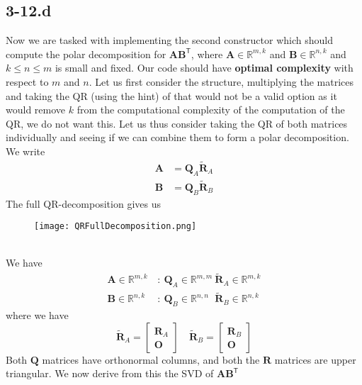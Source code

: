 \documentclass{article}
\begin{document}
\subsection*{3-12.d}
Now we are tasked with implementing the second constructor which should compute the polar decomposition for $\mathbf{A}\mathbf{B}^{\mathsf{T}}$, where $\mathbf{A}\in \mathbb{R}^{m,k}$ and $\mathbf{B}\in \mathbb{R}^{n,k}$ and $k \leq n \leq m$  is small and fixed. Our code should have \textbf{optimal complexity} with respect to $m$ and $n$. Let us first consider the structure, multiplying the matrices and taking the QR (using the hint) of that would not be a valid option as it would remove $k$ from the computational complexity of the computation of the QR, we do not want this. Let us thus consider taking the QR of both matrices individually and seeing if we can combine them to form a polar decomposition. We write
\begin{align*}
    \mathbf{A} &= \mathbf{Q}_{A}\mathbf{\tilde{R}}_{A} \\
    \mathbf{B} &= \mathbf{Q}_{B}\mathbf{\tilde{R}}_{B}
\end{align*}
The full QR-decomposition gives us
\begin{figure}[!hbt]
    \centering
\texttt{[image: QRFullDecomposition.png]}
\end{figure} \\
We have 
\begin{align*}
    \mathbf{A}\in \mathbb{R}^{m,k} \, &: \: \mathbf{Q}_{A} \in \mathbb{R}^{m,m} \: \mathbf{\tilde{R}}_{A} \in \mathbb{R}^{m,k} \\
    \mathbf{B}\in \mathbb{R}^{n,k} \, &: \: \mathbf{Q}_{B} \in \mathbb{R}^{n,n} \:\: \,\mathbf{\tilde{R}}_{B} \in \mathbb{R}^{n,k}
\end{align*}
where we have 
\begin{equation*}
    \mathbf{\tilde{R}}_{A} = \begin{bmatrix}
    \mathbf{R}_{A}\\
    \mathbf{O}
    \end{bmatrix} \quad \mathbf{\tilde{R}}_{B} = \begin{bmatrix}
    \mathbf{R}_{B}\\
    \mathbf{O}
    \end{bmatrix}
\end{equation*}
Both $\mathbf{Q}$ matrices have orthonormal columns, and both the $\mathbf{R}$ matrices are upper triangular. We now derive from this the SVD of $\mathbf{A}\mathbf{B}^{\mathsf{T}}$
\end{document}
